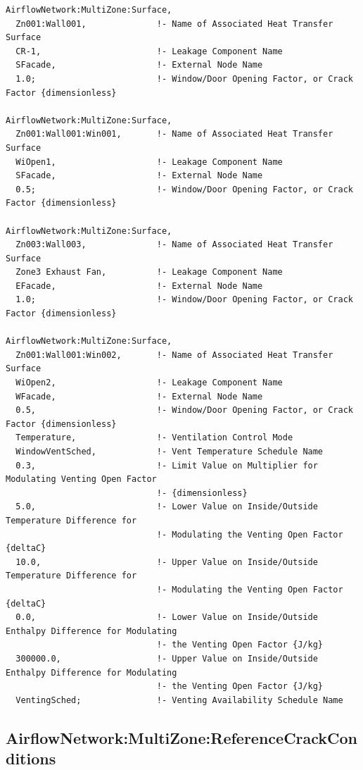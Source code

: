 \begin{lstlisting}
AirflowNetwork:MultiZone:Surface,
  Zn001:Wall001,              !- Name of Associated Heat Transfer Surface
  CR-1,                       !- Leakage Component Name
  SFacade,                    !- External Node Name
  1.0;                        !- Window/Door Opening Factor, or Crack Factor {dimensionless}

AirflowNetwork:MultiZone:Surface,
  Zn001:Wall001:Win001,       !- Name of Associated Heat Transfer Surface
  WiOpen1,                    !- Leakage Component Name
  SFacade,                    !- External Node Name
  0.5;                        !- Window/Door Opening Factor, or Crack Factor {dimensionless}

AirflowNetwork:MultiZone:Surface,
  Zn003:Wall003,              !- Name of Associated Heat Transfer Surface
  Zone3 Exhaust Fan,          !- Leakage Component Name
  EFacade,                    !- External Node Name
  1.0;                        !- Window/Door Opening Factor, or Crack Factor {dimensionless}

AirflowNetwork:MultiZone:Surface,
  Zn001:Wall001:Win002,       !- Name of Associated Heat Transfer Surface
  WiOpen2,                    !- Leakage Component Name
  WFacade,                    !- External Node Name
  0.5,                        !- Window/Door Opening Factor, or Crack Factor {dimensionless}
  Temperature,                !- Ventilation Control Mode
  WindowVentSched,            !- Vent Temperature Schedule Name
  0.3,                        !- Limit Value on Multiplier for Modulating Venting Open Factor
                              !- {dimensionless}
  5.0,                        !- Lower Value on Inside/Outside Temperature Difference for
                              !- Modulating the Venting Open Factor {deltaC}
  10.0,                       !- Upper Value on Inside/Outside Temperature Difference for
                              !- Modulating the Venting Open Factor {deltaC}
  0.0,                        !- Lower Value on Inside/Outside Enthalpy Difference for Modulating
                              !- the Venting Open Factor {J/kg}
  300000.0,                   !- Upper Value on Inside/Outside Enthalpy Difference for Modulating
                              !- the Venting Open Factor {J/kg}
  VentingSched;               !- Venting Availability Schedule Name
\end{lstlisting}

\subsection{AirflowNetwork:MultiZone:ReferenceCrackConditions}\label{airflownetworkmultizonereferencecrackconditions}

